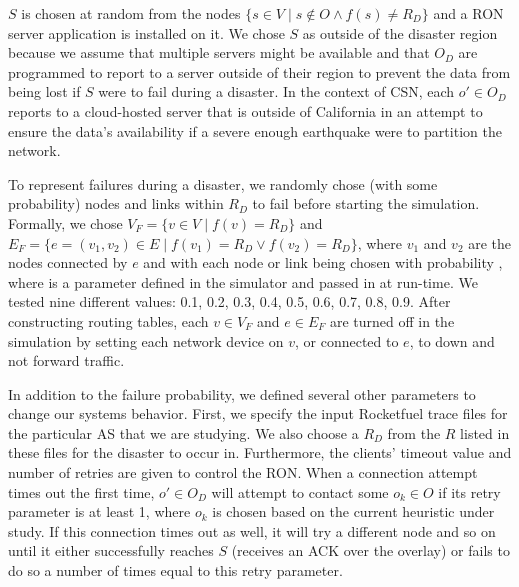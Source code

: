 \documentclass[conference]{IEEEtran}
\begin{document}
$S$ is chosen at random from the nodes $\{s \in V \mid s \notin O \wedge f(s) \neq R_D\}$ and a RON server application is installed on it.
We chose $S$ as outside of the disaster region because we assume that multiple servers might be available and that $O_D$ are programmed to report to a server outside of their region to prevent the data from being lost if $S$ were to fail during a disaster.
In the context of CSN, each $o' \in O_D$ reports to a cloud-hosted server that is outside of California in an attempt to ensure the data's availability if a severe enough earthquake were to partition the network.

To represent failures during a disaster, we randomly chose (with some probability) nodes and links within $R_D$ to fail before starting the simulation.
Formally, we chose $V_F = \{v \in V \mid f(v) = R_D\}$ and $E_F = \{e=(v_1,v_2) \in E \mid f(v_1) = R_D \vee f(v_2) = R_D\}$, where $v_1$ and $v_2$ are the nodes connected by $e$ and with each node or link being chosen with probability \pfail, where \pfail is a parameter defined in the simulator and passed in at run-time.
We tested nine different \pfail values: 0.1, 0.2, 0.3, 0.4, 0.5, 0.6, 0.7, 0.8, 0.9.
After constructing routing tables, each $v \in V_F$ and $e \in E_F$ are turned off in the simulation by setting each network device on $v$, or connected to $e$, to down and not forward traffic.

In addition to the failure probability, we defined several other parameters to change our systems behavior.
First, we specify the input Rocketfuel trace files for the particular AS that we are studying.
We also choose a $R_D$ from the $R$ listed in these files for the disaster to occur in.
Furthermore, the clients' timeout value and number of retries are given to control the RON.
When a connection attempt times out the first time, $o' \in O_D$ will attempt to contact some $o_k \in O$ if its retry parameter is at least 1, where $o_k$ is chosen based on the current heuristic under study.
If this connection times out as well, it will try a different node and so on until it either successfully reaches $S$ (receives an ACK over the overlay) or fails to do so a number of times equal to this retry parameter.
\end{document}
